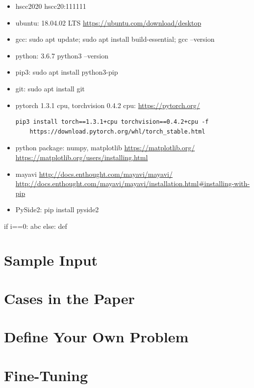 \documentclass{llncs}
\begin{document}
\begin{itemize}
    \item hscc2020 hscc20:111111
    \item ubuntu: 18.04.02 LTS \url{https://ubuntu.com/download/desktop}
    \item gcc: sudo apt update; sudo apt install build-essential; gcc --version
    \item python: 3.6.7 python3 --version 
    \item pip3: sudo apt install python3-pip
    \item git: sudo apt install git
    \item pytorch 1.3.1 cpu, torchvision 0.4.2 cpu: \url{https://pytorch.org/} \begin{verbatim}pip3 install torch==1.3.1+cpu torchvision==0.4.2+cpu -f 
    https://download.pytorch.org/whl/torch_stable.html\end{verbatim}
    \item python package: numpy, matplotlib \url{https://matplotlib.org/} \url{https://matplotlib.org/users/installing.html}
    \item mayavi \url{http://docs.enthought.com/mayavi/mayavi/} \url{http://docs.enthought.com/mayavi/mayavi/installation.html#installing-with-pip}
    \item PySide2: pip install pyside2
\end{itemize}

\begin{python}
    if i==0:
        abc
    else:
        def
\end{python}

\section{Sample Input}


\section{Cases in the Paper}

\section{Define Your Own Problem}

\section{Fine-Tuning}
\end{document}
